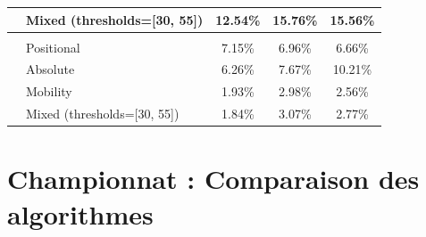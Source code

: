 \begin{table}[H]
{\begin{tabular}{
            @{}
            >{\raggedright\arraybackslash}p{1cm}
            >{\raggedright\arraybackslash}p{4cm}
            S
            S
            S
            @{}
            }
                           & Mixed (thresholds=[30, 55]) & 12.54\%                & 15.76\%                  & 15.56\%                 \\
            \midrule
                                                                                                   \\
            \cmidrule(lr){1-5}
                           & Positional                  & 7.15\%                 & 6.96\%                   & 6.66\%                  \\
                           & Absolute                    & 6.26\%                 & 7.67\%                   & 10.21\%                 \\
                           & Mobility                    & 1.93\%                 & 2.98\%                   & 2.56\%                  \\
                           & Mixed (thresholds=[30, 55]) & 1.84\%                 & 3.07\%                   & 2.77\%                  \\
            \bottomrule
        \end{tabular}
    }
    \label{tab:node_explored_summary}
\end{table}

\section{Championnat : Comparaison des algorithmes}
\label{sec:championship}

